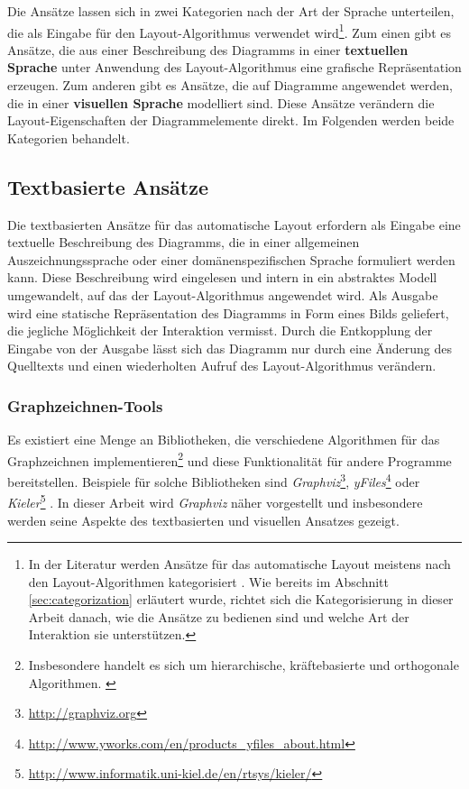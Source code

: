 Die Ansätze lassen sich in zwei Kategorien nach der Art der Sprache unterteilen, die als Eingabe für den Layout-Algorithmus verwendet wird\footnote{In der Literatur werden Ansätze für das automatische Layout meistens nach den Layout-Algorithmen kategorisiert \cite[S.39ff]{Fuhrmann11On-the-Pragmatics} \cite[S.32ff]{Eichelberger05Aesthetics}. Wie bereits im Abschnitt \ref{sec:categorization} erläutert wurde, richtet sich die Kategorisierung in dieser Arbeit danach, wie die Ansätze zu bedienen sind und welche Art der Interaktion sie unterstützen.}. Zum einen gibt es Ansätze, die aus einer Beschreibung des Diagramms in einer \textbf{textuellen Sprache} unter Anwendung des Layout-Algorithmus eine grafische Repräsentation erzeugen. Zum anderen gibt es Ansätze, die auf Diagramme angewendet werden, die in einer \textbf{visuellen Sprache} modelliert sind. Diese Ansätze verändern die Layout-Eigenschaften der Diagrammelemente direkt. Im Folgenden werden beide Kategorien behandelt.

\subsection{Textbasierte Ansätze}
\label{subsec:text-based-approaches}

Die textbasierten Ansätze für das automatische Layout erfordern als Eingabe eine textuelle Beschreibung des Diagramms, die in einer allgemeinen Auszeichnungssprache oder einer domänenspezifischen Sprache formuliert werden kann. Diese Beschreibung wird eingelesen und intern in ein abstraktes Modell umgewandelt, auf das der Layout-Algorithmus angewendet wird. Als Ausgabe wird eine statische Repräsentation des Diagramms in Form eines Bilds geliefert, die jegliche Möglichkeit der Interaktion vermisst. Durch die Entkopplung der Eingabe von der Ausgabe lässt sich das Diagramm nur durch eine Änderung des Quelltexts und einen wiederholten Aufruf des Layout-Algorithmus verändern.

\subsubsection{Graphzeichnen-Tools}
\label{subsubsec:graph-drawing-tools}

Es existiert eine Menge an Bibliotheken, die verschiedene Algorithmen für das Graphzeichnen implementieren\footnote{Insbesondere handelt es sich um hierarchische, kräftebasierte und orthogonale Algorithmen. \cite{Maier12A-Pattern-based}} und diese Funktionalität für andere Programme bereitstellen. Beispiele für solche Bibliotheken sind \textit{Graphviz}\footnote{\url{http://graphviz.org}}, \textit{yFiles}\footnote{\url{http://www.yworks.com/en/products_yfiles_about.html}} oder \textit{Kieler}\footnote{\url{http://www.informatik.uni-kiel.de/en/rtsys/kieler/}} \cite{Maier12A-Pattern-based}. In dieser Arbeit wird \textit{Graphviz} näher vorgestellt und insbesondere werden seine Aspekte des textbasierten und visuellen Ansatzes gezeigt.

